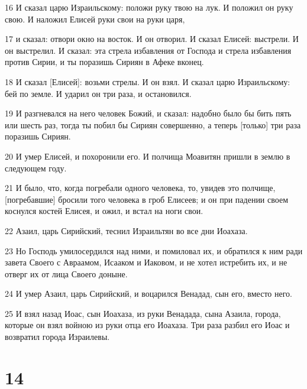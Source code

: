 \par 16 И сказал царю Израильскому: положи руку твою на лук. И положил он руку свою. И наложил Елисей руки свои на руки царя,
\par 17 и сказал: отвори окно на восток. И он отворил. И сказал Елисей: выстрели. И он выстрелил. И сказал: эта стрела избавления от Господа и стрела избавления против Сирии, и ты поразишь Сириян в Афеке вконец.
\par 18 И сказал [Елисей]: возьми стрелы. И он взял. И сказал царю Израильскому: бей по земле. И ударил он три раза, и остановился.
\par 19 И разгневался на него человек Божий, и сказал: надобно было бы бить пять или шесть раз, тогда ты побил бы Сириян совершенно, а теперь [только] три раза поразишь Сириян.
\par 20 И умер Елисей, и похоронили его. И полчища Моавитян пришли в землю в следующем году.
\par 21 И было, что, когда погребали одного человека, то, увидев это полчище, [погребавшие] бросили того человека в гроб Елисеев; и он при падении своем коснулся костей Елисея, и ожил, и встал на ноги свои.
\par 22 Азаил, царь Сирийский, теснил Израильтян во все дни Иоахаза.
\par 23 Но Господь умилосердился над ними, и помиловал их, и обратился к ним ради завета Своего с Авраамом, Исааком и Иаковом, и не хотел истребить их, и не отверг их от лица Своего доныне.
\par 24 И умер Азаил, царь Сирийский, и воцарился Венадад, сын его, вместо него.
\par 25 И взял назад Иоас, сын Иоахаза, из руки Венадада, сына Азаила, города, которые он взял войною из руки отца его Иоахаза. Три раза разбил его Иоас и возвратил города Израилевы.

\chapter{14}

